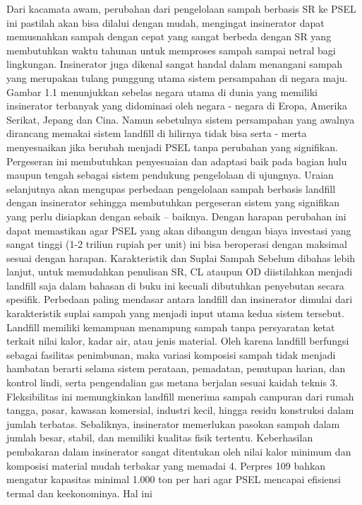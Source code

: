 \documentclass[
  letterpaper,
  DIV=11,
  numbers=noendperiod]{scrreprt}
\begin{document}
Dari kacamata awam, perubahan dari pengelolaan sampah berbasis SR ke
PSEL ini pastilah akan bisa dilalui dengan mudah, mengingat insinerator
dapat memusnahkan sampah dengan cepat yang sangat berbeda dengan SR yang
membutuhkan waktu tahunan untuk memproses sampah sampai netral bagi
lingkungan. Insinerator juga dikenal sangat handal dalam menangani
sampah yang merupakan tulang punggung utama sistem persampahan di negara
maju. Gambar 1.1 menunjukkan sebelas negara utama di dunia yang memiliki
insinerator terbanyak yang didominasi oleh negara - negara di Eropa,
Amerika Serikat, Jepang dan Cina. Namun sebetulnya sistem persampahan
yang awalnya dirancang memakai sistem landfill di hilirnya tidak bisa
serta - merta menyesuaikan jika berubah menjadi PSEL tanpa perubahan
yang signifikan. Pergeseran ini membutuhkan penyesuaian dan adaptasi
baik pada bagian hulu maupun tengah sebagai sistem pendukung pengelolaan
di ujungnya. Uraian selanjutnya akan mengupas perbedaan pengelolaan
sampah berbasis landfill dengan insinerator sehingga membutuhkan
pergeseran sistem yang signifikan yang perlu disiapkan dengan sebaik --
baiknya. Dengan harapan perubahan ini dapat memastikan agar PSEL yang
akan dibangun dengan biaya investasi yang sangat tinggi (1-2 triliun
rupiah per unit) ini bisa beroperasi dengan maksimal sesuai dengan
harapan. Karakteristik dan Suplai Sampah Sebelum dibahas lebih lanjut,
untuk memudahkan penulisan SR, CL ataupun OD diistilahkan menjadi
landfill saja dalam bahasan di buku ini kecuali dibutuhkan penyebutan
secara spesifik. Perbedaan paling mendasar antara landfill dan
insinerator dimulai dari karakteristik suplai sampah yang menjadi input
utama kedua sistem tersebut. Landfill memiliki kemampuan menampung
sampah tanpa persyaratan ketat terkait nilai kalor, kadar air, atau
jenis material. Oleh karena landfill berfungsi sebagai fasilitas
penimbunan, maka variasi komposisi sampah tidak menjadi hambatan berarti
selama sistem perataan, pemadatan, penutupan harian, dan kontrol lindi,
serta pengendalian gas metana berjalan sesuai kaidah teknis 3.
Fleksibilitas ini memungkinkan landfill menerima sampah campuran dari
rumah tangga, pasar, kawasan komersial, industri kecil, hingga residu
konstruksi dalam jumlah terbatas. Sebaliknya, insinerator memerlukan
pasokan sampah dalam jumlah besar, stabil, dan memiliki kualitas fisik
tertentu. Keberhasilan pembakaran dalam insinerator sangat ditentukan
oleh nilai kalor minimum dan komposisi material mudah terbakar yang
memadai 4. Perpres 109 bahkan mengatur kapasitas minimal 1.000 ton per
hari agar PSEL mencapai efisiensi termal dan keekonominya. Hal ini
\end{document}
